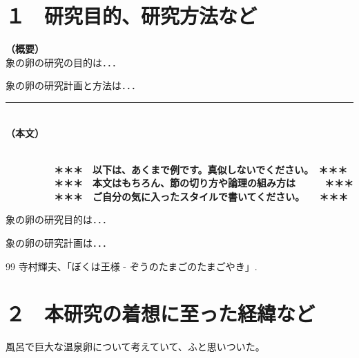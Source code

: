 \documentclass[11pt,a4j,dvipdfmx]{jarticle} 					%
\newcommand{\研究課題名}{象の卵}
\newcommand{\研究機関名}{逢坂大学}
\newcommand{\研究代表者氏名}{湯川秀樹}
\begin{document}

\section{１　研究目的、研究方法など}

\noindent
\textbf{（概要）}\\
	象の卵の研究の目的は．．．	

	象の卵の研究計画と方法は．．．
	\vspace*{10zw}	%

\noindent
\rule{\linewidth}{1pt}\\
\noindent
\textbf{（本文）}
\JSPSInstructions	%

\textbf{\\　　　　　＊＊＊　以下は、あくまで例です。真似しないでください。　＊＊＊\\
　　　　　＊＊＊　本文はもちろん、節の切り方や論理の組み方は　　　＊＊＊\\
　　　　　＊＊＊　ご自分の気に入ったスタイルで書いてください。　　＊＊＊}

	 象の卵の研究目的は．．．

	象の卵の研究計画は．．．

	\vspace{1cm}
	\begin{thebibliography}{99}
		 寺村輝夫、「ぼくは王様 - ぞうのたまごのたまごやき」.
	\end{thebibliography}




\section{２　本研究の着想に至った経緯など}

		風呂で巨大な温泉卵について考えていて、ふと思いついた。
\end{document}
